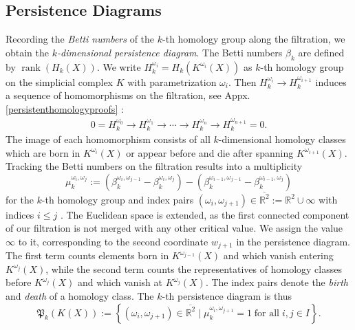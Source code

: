 \documentclass[envcountsect,runningheads]{llncs}
\DeclareMathOperator{\rank}{rank}
\begin{document}
\subsection{Persistence Diagrams}
Recording the \emph{Betti numbers} of the $k$-th homology group along the filtration, we obtain the \emph{$k$-dimensional persistence diagram}. The Betti numbers $\beta_k$ are defined by $\rank(H_k(X))$. We write $H^{\omega_i}_k = H_k(K^{\omega_i}(X))$ as $k$-th homology group on the simplicial complex $K$ with parametrization $\omega_i$. Then $H^{\omega_{i}}_{k} \rightarrow H^{\omega_{i+1}}_k$ induces a sequence of homomorphisms on the filtration, see Appx. \ref{persistenthomologyproofs} :
\begin{align}
0 = H^{\omega_{0}}_k \rightarrow H^{\omega_{1}}_k \rightarrow \cdots \rightarrow H^{\omega_{n}}_k \rightarrow H^{\omega_{n+1}}_k = 0.
\end{align}
The image of each homomorphism consists of all $k$-dimensional homology classes which are born in $K^{\omega_i}(X)$ or appear before and die after spanning $K^{\omega_{i+1}}(X)$. Tracking the Betti numbers on the filtration results into a multiplicity
\begin{equation}
\mu^{\omega_{i},\omega_{j}}_k := (\beta_k^{\omega_{i},\omega_{j-1}} - \beta_k^{\omega_i,\omega_{j}})-(\beta_k^{\omega_{i-1},\omega_{j-1}}-\beta_k^{\omega_{i-1},\omega_{j}})
\end{equation}
for the $k$-th homology group and index pairs $(\omega_i,\omega_{j+1}) \in \overline{\mathbb{R}^2} := \mathbb{R}^2 \cup \infty$ with indices $i \leq j$ . The Euclidean space is extended, as the first connected component of our filtration is not merged with any other critical value. We assign the value $\infty$ to it, corresponding to the second coordinate $w_{j+1}$ in the persistence diagram. The first term counts elements born in $K^{\omega_{j-1}}(X)$ and which vanish entering $K^{\omega_{j}}(X)$, while the second term counts the representatives of homology classes before $K^{\omega_{j}}(X)$ and which vanish at $K^{\omega_{j}}(X)$. The index pairs denote the \emph{birth} and \emph{death} of a homology class. The $k$-th persistence diagram is thus
\begin{equation}
\mathfrak{P}_k(K(X)) := \left\{(\omega_i, \omega_{j+1}) \in \overline{\mathbb{R}^2} \; \bigg\vert \; \mu^{\omega_{i},\omega_{j+1}}_k = 1 \; \text{for all} \; i,j \in I \right\}.
\end{equation}
\end{document}
